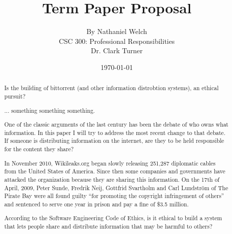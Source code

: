 \documentclass[11pt]{article}
\begin{document}
\title{\vfill Term Paper Proposal} %
\author{
By Nathaniel Welch\vspace{10pt}\\
CSC 300: Professional Responsibilities\vspace{10pt}\\
Dr. Clark Turner\vspace{10pt}\\
}
\date{\today}

\maketitle

\vfill %
\begin{abstract}

Is the building of bittorrent (and other information distrobtion systems), an ethical pursuit?

... something something something.

One of the classic arguments of the last century has been the debate of who owns what information. In this paper I will try to address the most recent change to that debate. If someone is distributing information on the internet, are they to be held responsible for the content they share?

In November 2010, Wikileaks.org began slowly releasing 251,287 diplomatic cables from the United States of America. \cite{cablegate} Since then some companies and governments have attacked the organization because they are sharing this information. On the 17th of April, 2009, Peter Sunde, Fredrik Neij, Gottfrid Svartholm and Carl Lundström of The Pirate Bay were all found guilty ``for promoting the copyright infringement of others'' and sentenced to serve one year in prison and pay a fine of \$3.5 million. \cite{tpbverdict}

According to the Software Engineering Code of Ethics, is it ethical to build a system that lets people share and distribute information that may be harmful to others?
\end{abstract}

\thispagestyle{empty} %
\newpage
\end{document}
